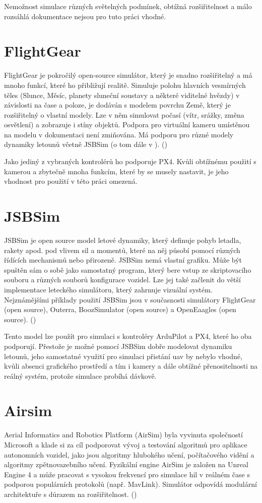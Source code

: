         Nemožnost simulace různých světelných podmínek, obtížná rozšiřitelnost a málo rozsáhlá dokumentace nejsou pro tuto práci vhodné.

    \section{FlightGear} \label{sec:flightgear}
        FlightGear je pokročilý open-source simulátor, který je snadno rozšiřitelný a má mnoho funkcí, které ho přibližují realitě. Simuluje polohu hlavních vesmírných těles (Slunce, Měsíc, planety sluneční soustavy a některé viditelné hvězdy) v závislosti na čase a poloze, je dodáván s modelem povrchu Země, který je rozšiřitelný o vlastní modely. Lze v něm simulovat počasí (vítr, srážky, změna osvětlení) a zobrazuje i stíny objektů. Podpora pro virtuální kameru umístěnou na modelu v dokumentaci není zmiňována. Má podporu pro různé modely dynamiky letounů včetně JSBSim (o tom dále v ). (\cite{flightgear})

        Jako jediný z vybraných kontrolérů ho podporuje PX4. Kvůli obtížnému použití s kamerou a zbytečně mnoha funkcím, které by se musely nastavit, je jeho vhodnost pro použití v této práci omezená.

    \section{JSBSim} \label{sec:jsbsim}
        JSBSim je open source model letové dynamiky, který definuje pohyb letadla, rakety apod. pod vlivem sil a momentů, které na něj působí pomocí různých řídících mechanismů nebo přirozeně. JSBSim nemá vlastní grafiku. Může být spuštěn sám o sobě jako samostatný program, který bere vstup ze skriptovacího souboru a různých souborů konfigurace vozidel. Lze jej také začlenit do větší implementace leteckého simulátoru, který zahrnuje vizuální systém. Nejznámějšími příklady použití JSBSim jsou v současnosti simulátory FlightGear (open source), Outerra, BoozSimulator (open source) a OpenEaagles (open source). (\cite{jsbsim})

        Tento model lze použít pro simulaci s kontroléry ArduPilot a PX4, které ho oba podporují. Přestože je možné pomocí JSBSim dobře modelovat dynamiku letounů, jeho samostatné využití pro simulaci přistání \acrshort{uav} by nebylo vhodné, kvůli absenci grafického prostředí a tím i kamery a dále obtížné přenositelnosti na reálný systém, protože simulace probíhá dávkově.

    \section{Airsim} \label{sec:airsim}
        Aerial Informatics and Robotics Platform (AirSim) byla vyvinuta společností Microsoft a klade si za cíl podporovat vývoj a testování algoritmů pro aplikace autonomních vozidel, jako jsou algoritmy hlubokého učení, počítačového vidění a algoritmy zpětnovazebního učení. Fyzikální engine AirSim je založen na Unreal Engine 4 a může pracovat s vysokou frekvencí pro simulace \acrshort{hil} v reálném čase s podporou populárních protokolů (např. MavLink). Simulátor odpovídá modulární architektuře s důrazem na rozšiřitelnost. (\cite{Ebeid2018})

